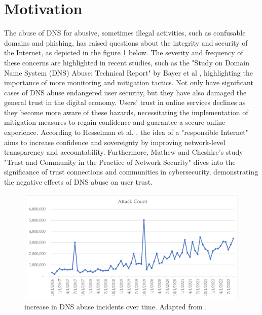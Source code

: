 \section{Motivation}

 The abuse of DNS for abusive, sometimes illegal activities, such as confusable domains and phishing, has raised questions about the integrity and security of the Internet, as depicted in the figure \ref{fig:dnsintro2} below. The severity and frequency of these concerns are highlighted in recent studies, such as the "Study on Domain Name System (DNS) Abuse: Technical Report" by Bayer et al \cite{bayer2022}, highlighting the importance of more monitoring and mitigation tactics. Not only have significant cases of DNS abuse endangered user security, but they have also damaged the general trust in the digital economy. Users' trust in online services declines as they become more aware of these hazards, necessitating the implementation of mitigation measures to regain confidence and guarantee a secure online experience. According to Hesselman et al. \cite{hesselman2020}, the idea of a "responsible Internet" aims to increase confidence and sovereignty by improving network-level transparency and accountability. Furthermore, Mathew and Cheshire's \cite{mathew2016} study "Trust and Community in the Practice of Network Security" dives into the significance of trust connections and communities in cybersecurity, demonstrating the negative effects of DNS abuse on user trust.

\begin{figure}[H]
    \centering
    \includegraphics[width=0.5\linewidth]{introduction/maliciousActivity.png}
    \caption{ increase in DNS abuse incidents over time. Adapted from \cite{Rich2023Cyberpsychology}.}
    \label{fig:dnsintro2}
\end{figure}

